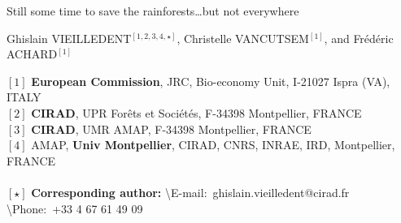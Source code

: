 \renewcommand{\bibsection}{}  %

\begin{center}
  \LARGE{Still some time to save the rainforests\ldots but not everywhere}
\end{center}

\vspace{1cm}

\begin{center}
  \large{Ghislain VIEILLEDENT$^{[1, 2, 3, 4, \star]}$, Christelle VANCUTSEM$^{[1]}$, and Frédéric ACHARD$^{[1]}$}
\end{center}

\vspace{1cm}

{\small
  \begin{flushleft}  
    $[1]$ \textbf{European Commission}, JRC, Bio-economy Unit, I-21027 Ispra (VA), ITALY\\
    $[2]$ \textbf{CIRAD}, UPR Forêts et Sociétés, F-34398 Montpellier, FRANCE\\
    $[3]$ \textbf{CIRAD}, UMR AMAP, F-34398 Montpellier, FRANCE\\
    $[4]$ AMAP, \textbf{Univ Montpellier}, CIRAD, CNRS, INRAE, IRD, Montpellier, FRANCE\\
    ~\\
    $[\star]$ \textbf{Corresponding author:}
    \textbackslash{E-mail}:~ghislain.vieilledent@cirad.fr
    \textbackslash{Phone}:~+33 4 67 61 49 09\\
  \end{flushleft}}

\newpage
